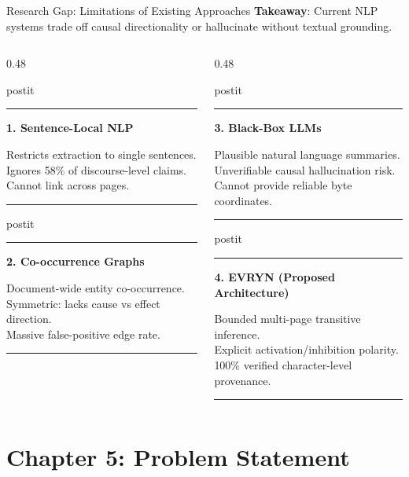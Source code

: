 \documentclass[aspectratio=43,10pt]{beamer}
\newcommand{\card}[4][\linewidth]{%
  \begin{beamercolorbox}[wd=#1,sep=0pt,rounded=false,shadow=false]{postit}%
    {\color{#3}\rule{\linewidth}{1.5pt}}\par
    \colorbox{slatebg}{%
      \begin{minipage}{\dimexpr#1-8pt\relax}%
        \vspace{1.5pt}%
        {\footnotesize\bfseries\color{#3}#2}\vspace{1.5pt}\par%
        {\scriptsize\color{darktext}#4}%
        \vspace{1.5pt}%
      \end{minipage}%
    }%
    \par{\color{bordergray}\rule{\linewidth}{0.6pt}}%
  \end{beamercolorbox}%
}
\begin{document}
\begin{frame}{Research Gap: Limitations of Existing Approaches}
  \textbf{Takeaway}: Current NLP systems trade off causal directionality or hallucinate without textual grounding.
  \vspace{0.15cm}
  \begin{columns}[T]
    \begin{column}{0.48\textwidth}
      \card{1. Sentence-Local NLP}{red}{
        \textbullet{} Restricts extraction to single sentences.\\
        \textbullet{} Ignores 58\% of discourse-level claims.\\
        \textbullet{} Cannot link across pages.
      }
      \vspace{0.12cm}
      \card{2. Co-occurrence Graphs}{amber}{
        \textbullet{} Document-wide entity co-occurrence.\\
        \textbullet{} Symmetric: lacks cause vs effect direction.\\
        \textbullet{} Massive false-positive edge rate.
      }
    \end{column}
    \begin{column}{0.48\textwidth}
      \card{3. Black-Box LLMs}{red}{
        \textbullet{} Plausible natural language summaries.\\
        \textbullet{} Unverifiable causal hallucination risk.\\
        \textbullet{} Cannot provide reliable byte coordinates.
      }
      \vspace{0.12cm}
      \card{4. EVRYN (Proposed Architecture)}{teal}{
        \textbullet{} Bounded multi-page transitive inference.\\
        \textbullet{} Explicit activation/inhibition polarity.\\
        \textbullet{} 100\% verified character-level provenance.
      }
    \end{column}
  \end{columns}
\end{frame}

\section{Chapter 5: Problem Statement}
\end{document}
